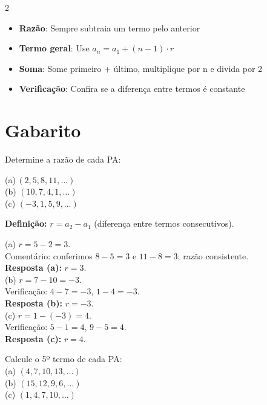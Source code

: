 \documentclass[11pt]{article}
\begin{document}
\begin{multicols}{2}
\begin{itemize}
\item \textbf{Razão}: Sempre subtraia um termo pelo anterior
\item \textbf{Termo geral}: Use $a_n = a_1 + (n-1) \cdot r$
\item \textbf{Soma}: Some primeiro + último, multiplique por n e divida por 2
\item \textbf{Verificação}: Confira se a diferença entre termos é constante
\end{itemize}


\section*{Gabarito}

\begin{tcolorbox}[colback=blue!8,colframe=blue!60!black, title=\textbf{Questão 1 }, text width=0.9\columnwidth]
Determine a razão de cada PA:

(a)\,$(2,5,8,11,\ldots)$\\ (b) $(10,7,4,1,\ldots)$ \\ (c) $(-3,1,5,9,\ldots)$
\end{tcolorbox}

\begin{tcolorbox}[colback=green!10,colframe=green!60!black, title=\textbf{Solução da questão 1 }, text width=0.9\columnwidth]
\textbf{Definição:} $r = a_2 - a_1$ (diferença entre termos consecutivos).

(a) $r = 5-2 = 3$. \\
Comentário: conferimos $8-5=3$ e $11-8=3$; razão consistente. \\
    \textbf{Resposta (a):} $\boxed{r = 3}$. \\

(b) $r = 7-10 = -3$. \\
Verificação: $4-7=-3$, $1-4=-3$. \\
    \textbf{Resposta (b):} $ \boxed{r = -3}$. \\

(c) $r = 1-(-3) = 4$. \\
Verificação: $5-1=4$, $9-5=4$. \\
    \textbf{Resposta (c):} $\boxed{r = 4}$. 
\end{tcolorbox}

\begin{tcolorbox}[colback=blue!8,colframe=blue!60!black, title=\textbf{Questão 2 }, text width=0.9\columnwidth]
Calcule o 5º termo de cada PA: \\
(a) $(4,7,10,13,\ldots)$ \\ (b) $(15,12,9,6,\ldots)$ \\ (c) $(1,4,7,10,\ldots)$
\end{tcolorbox}


\end{multicols}
\end{document}
